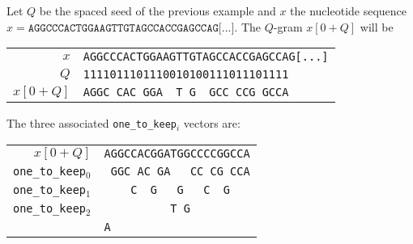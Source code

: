 \begin{example}
	Let $Q$ be the spaced seed of the previous example and $x$ the nucleotide sequence $x = \texttt{AGGCCCACTGGAAGTTGTAGCCACCGAGCCAG[...]}$. The $Q$-gram $x[0 + Q]$ will be
	\begin{center}
		\begin{tabular}{r || l}
			$x$ & \texttt{AGGCCCACTGGAAGTTGTAGCCACCGAGCCAG[...]} \\
			$Q$ & \texttt{1111011101110010100111011101111} \\
			$x[0 + Q]$ & \texttt{AGGC\ CAC\ GGA\ \ T\ G\ \ GCC\ CCG\ GCCA} \\
		\end{tabular}
	\end{center}
	
	The three associated \verb|one_to_keep|$_i$ vectors are:
	\begin{center}
		\begin{tabular}{r || l}
			$x[0 + Q]$ & \texttt{AGGCCACGGATGGCCCCGGCCA} \\
			\verb|one_to_keep|$_0$ & \texttt{\ GGC\ AC\ GA\ \ \ CC\ CG\ CCA} \\
			\verb|one_to_keep|$_1$ & \texttt{\ \ \ \ C\ \ G\ \ \ G\ \ \ C\ \ G\ \ \ } \\
			\verb|one_to_keep|$_2$ & \texttt{\ \ \ \ \ \ \ \ \ \ T\ G\ \ \ \ \ \ \ \ \ } \\
			& \texttt{A\ \ \ \ \ \ \ \ \ \ \ \ \ \ \ } \\
		\end{tabular}
	\end{center}
	

\end{example}
